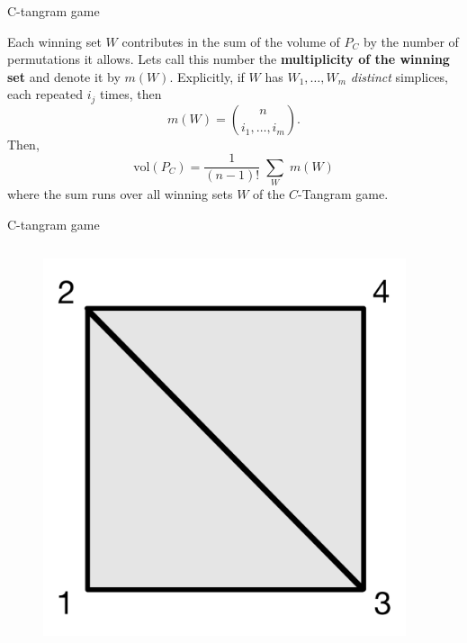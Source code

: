 \documentclass{beamer}
\begin{document}
\begin{frame}{C-tangram game}

Each winning set ${W}$ contributes in the sum of the volume of $P_C$ by the number of permutations it allows. \pause Lets call this number the \textbf{multiplicity of the winning set} and denote it by $m({W})$. \pause Explicitly, if ${W}$ has $W_1,\ldots,W_m$ \textit{distinct} simplices, each repeated $i_j$ times, then $$m({W}) = {{n}\choose {i_1,\ldots,i_m}}.$$ \pause Then, $$\text{vol}(P_C) = \frac{1}{(n-1)!} \; {\sum}_{{W}} \; m({W})$$ where the sum runs over all winning sets ${W}$ of the $C$-Tangram game.

    
\end{frame}

\begin{frame}{C-tangram game}
\begin{columns}
\begin{column}{0.5\textwidth}
   \begin{figure}
        \centering
        \includegraphics[scale=0.1]{images/SimpComplex.png}
    \end{figure}
\end{column}
\pause
\begin{column}{0.5\textwidth}  %
    \begin{center}

\end{center}
\end{column}
\end{columns}
\end{frame}
\end{document}

